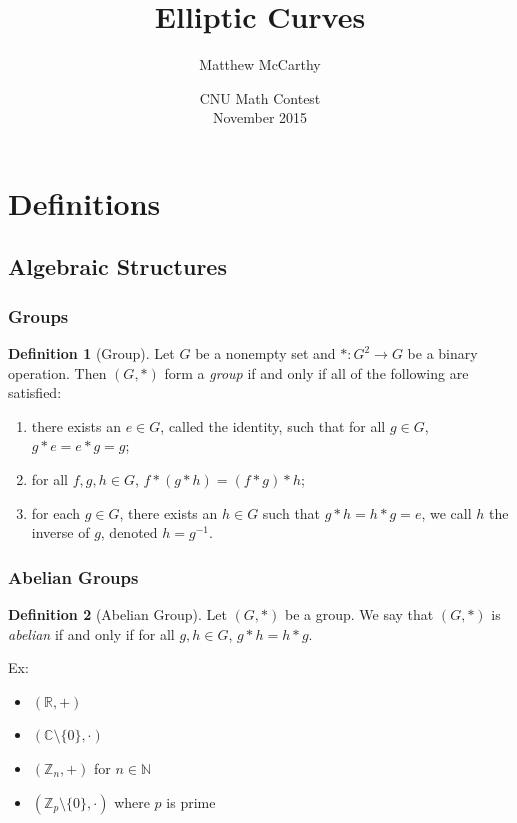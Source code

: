 \documentclass[xcolor=pdftex,dvipsnames,table]{beamer}
\theoremstyle{plain}
\theoremstyle{definition}
\newtheorem{defn}{Definition}[section]
\def\CC{\mathbb{C}}
\def\RR{\mathbb{R}}
\def\ZZ{\mathbb{Z}}
\def\NN{\mathbb{N}}
\newcommand{\set}[1]{\lbrace #1 \rbrace}
\begin{document}
\title[Elliptic Curves] %
{Elliptic Curves}
\author[McCarthy] %
{Matthew McCarthy}
\date[11/14/15] %
{CNU Math Contest\\ November 2015}


\frame{\titlepage}

\frame{\tableofcontents}

\section[Definitions]{Definitions}

\subsection[Algebraic Structures]{Algebraic Structures}

\begin{frame}
	\frametitle{Groups}
	
	\begin{defn}[Group]
		Let $G$ be a nonempty set and $*:G^2\rightarrow G$ be a binary operation.
		Then $(G,*)$ form a \textit{group} if and only if all of the following are satisfied:
		\begin{enumerate}
			\item there exists an $e\in G$, called the identity, such that for all $g\in G$, $g*e=e*g=g$;
			\item for all $f,g,h\in G$, $f*(g*h)=(f*g)*h$;
			\item for each $g\in G$, there exists an $h\in G$ such that $g*h=h*g=e$, we call $h$ the inverse of $g$, denoted $h=g^{-1}$.
		\end{enumerate}
	\end{defn}
\end{frame}

\begin{frame}
	\frametitle{Abelian Groups}
	\begin{defn}[Abelian Group]
		Let $(G,*)$ be a group. We say that $(G,*)$ is \textit{abelian} if and only if for all $g,h\in G$, $g*h=h*g$.
	\end{defn}
	
	Ex: 
	\begin{itemize}
		\item $(\RR,+)$
		\item $(\CC\setminus\set{0},\cdot)$
		\item $(\ZZ_n,+)$ for $n\in\NN$
		\item $(\ZZ_p\setminus\set{0}, \cdot)$ where $p$ is prime
	\end{itemize}
\end{frame}
\end{document}
